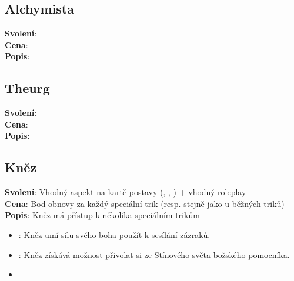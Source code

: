 \documentclass[../main.tex]{subfiles}
\begin{document}
\begin{povolani}
\subsection{Alchymista}
\label{sec:pov-alchymista}
\textbf{Svolení}:\\
\textbf{Cena}:\\
\textbf{Popis}:\\

\end{povolani}

\begin{povolani}
\subsection{Theurg}
\label{sec:pov-theurg}
\textbf{Svolení}:\\
\textbf{Cena}:\\
\textbf{Popis}:\\

\end{povolani}

\begin{povolani}  
\subsection{Kněz}
\label{sec:pov-knez}
\textbf{Svolení}: Vhodný aspekt na kartě postavy (, , ) + vhodný roleplay \\
\textbf{Cena}: Bod obnovy za každý speciální trik (resp. stejně jako u běžných triků) \\
\textbf{Popis}: Kněz má přístup k několika speciálním trikům \\
\begin{itemize}
	\item {}: Kněz umí sílu svého boha použít k sesílání zázraků. 
	\item {}: Kněz získává možnost přivolat si ze Stínového světa božského pomocníka.
	\item {}
\end{itemize}
\end{povolani}
\end{document}

